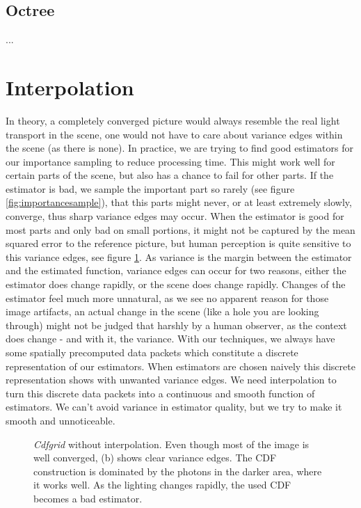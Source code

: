 \subsection{Octree}

...

\section{Interpolation}
\label{ch:interpolation}

In theory, a completely converged picture would always resemble the real light transport in the scene, one would not have to care about variance edges within the scene (as there is none). In practice, we are trying to find good estimators for our importance sampling to reduce processing time. This might work well for certain parts of the scene, but also has a chance to fail for other parts. If the estimator is bad, we sample the important part so rarely (see figure \ref{fig:importancesample}), that this parts might never, or at least extremely slowly, converge, thus sharp variance edges may occur. When the estimator is good for most parts and only bad on small portions, it might not be captured by the mean squared error to the reference picture, but human perception is quite sensitive to this variance edges, see figure \ref{fig:varianceEdgeCdfgrid}. As variance is the margin between the estimator and the estimated function, variance edges can occur for two reasons, either the estimator does change rapidly, or the scene does change rapidly. Changes of the estimator feel much more unnatural, as we see no apparent reason for those image artifacts, an actual change in the scene (like a hole you are looking through) might not be judged that harshly by a human observer, as the context does change - and with it, the variance. With our techniques, we always have some spatially precomputed data packets which constitute a discrete representation of our estimators. When estimators are chosen naively this discrete representation shows with unwanted variance edges. We need interpolation to turn this discrete data packets into a continuous and smooth function of estimators. We can't avoid variance in estimator quality, but we try to make it smooth and unnoticeable.

\begin{figure}[htb] 
	\centering
    
    \caption{\textit{Cdfgrid} without interpolation. Even though most of the image is well converged, (b) shows clear variance edges. The CDF construction is dominated by the photons in the darker area, where it works well. As the lighting changes rapidly, the used CDF becomes a bad estimator.} 
    \label{fig:varianceEdgeCdfgrid}
\end{figure}

